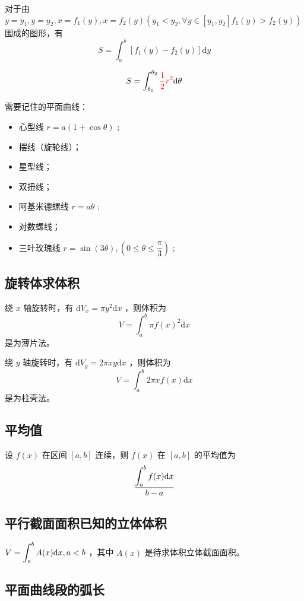对于由 $ y = y_1, y = y_2,x = f_1(y), x = f_2(y) (y_1 < y_2,\forall y \in [y_1,y_2]f_1(y) > f_2(y)) $ 
围成的图形，有 $$
    S = \int_a^b[f_1(y)-f_2(y)]\mathrm{d}y
$$ 


$$
    S = \int_{\theta_1}^{\theta_2}\textcolor{red}{\dfrac{1}{2}r^2}\mathrm{d}\theta
$$ 

需要记住的平面曲线：
\begin{itemize}
    \item 心型线 $ r = a(1+\cos\theta) $ ;
    \item 摆线（旋轮线）；
    \item 星型线；
    \item 双扭线；
    \item 阿基米德螺线 $ r = a\theta $ ;
    \item 对数螺线；
    \item 三叶玫瑰线 $ r = \sin(3\theta),(0\leq\theta\leq \dfrac{\pi}{3}) $ ;
\end{itemize}

\subsection{旋转体求体积}

绕 $ x $ 轴旋转时，有 $ \mathrm{d}V_x = \pi y^2 \mathrm{d}x $ ，则体积为$$
    V = \int_a^b \pi f(x)^2 \mathrm{d}x
$$ 
是为薄片法。

绕 $ y $ 轴旋转时，有 $ \mathrm{d}V_y = 2\pi xy \mathrm{d} x $ ，则体积为$$
    V = \int_a^b 2\pi xf(x)\mathrm{d}x
$$ 
是为柱壳法。

\subsection{平均值}

设 $ f(x) $ 在区间 $ [a,b] $ 连续，则 $ f(x) $ 在 $ [a,b] $ 的平均值为
$$
    \dfrac{\displaystyle \int_a^b f(x)\mathrm{d}x}{b-a}
$$ 

\subsection{平行截面面积已知的立体体积}

$ \displaystyle V = \int_a^bA(x)\mathrm{d}x,a<b $ ，其中 $ A(x) $ 是待求体积立体截面面积。

\subsection{平面曲线段的弧长}

